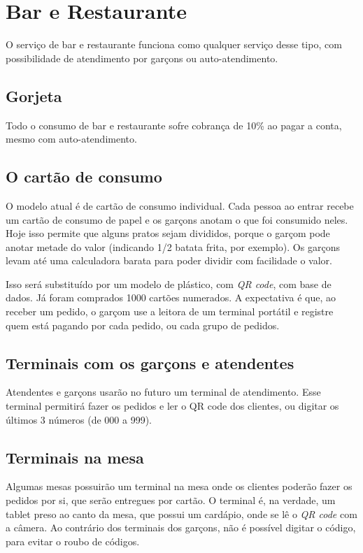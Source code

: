 \chapter{Bar e Restaurante}
\label{chap:barest}

O serviço de bar e restaurante funciona como qualquer serviço desse tipo, com possibilidade de atendimento por garçons ou auto-atendimento.

\section{Gorjeta}

Todo o consumo de bar e restaurante sofre cobrança de 10\% ao pagar a conta, mesmo com auto-atendimento.

\section{O cartão de consumo}

O modelo atual é de cartão de consumo individual. Cada pessoa ao entrar recebe um cartão de consumo de papel e os garçons anotam o que foi consumido neles. Hoje isso permite que alguns pratos sejam divididos, porque o garçom pode anotar metade do valor (indicando 1/2 batata frita, por exemplo). Os garçons levam até uma calculadora barata para poder dividir com facilidade o valor.

Isso será substituído por um modelo de plástico, com \textit{QR code}, com base de dados. Já foram comprados 1000 cartões numerados. A expectativa é que, ao receber um pedido, o garçom use a leitora de um terminal portátil e registre quem está pagando por cada pedido, ou cada grupo de pedidos. 


\section{Terminais com os garçons e atendentes}

Atendentes e garçons usarão no futuro um terminal de atendimento. Esse terminal permitirá fazer os pedidos e ler o QR code dos clientes, ou digitar os últimos 3 números (de 000 a 999). 

\section{Terminais na mesa}


Algumas mesas possuirão um terminal na mesa onde os clientes poderão fazer os pedidos por si, que serão entregues por cartão. O terminal é, na verdade, um tablet preso ao canto da mesa, que possui um cardápio, onde se lê o \textit{QR code} com a câmera. Ao contrário dos terminais dos garçons, não é possível digitar o código, para evitar o roubo de códigos.

